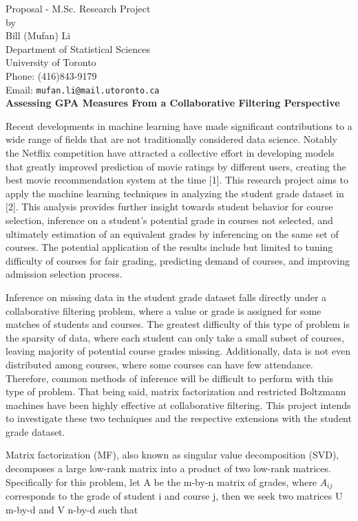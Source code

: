 \documentclass[12pt]{article}
\begin{document}
\begin{center}
Proposal - M.Sc. Research Project \\
by \\
Bill (Mufan) Li \\
Department of Statistical Sciences \\
University of Toronto \\
Phone: (416)843-9179\\
Email: {\tt mufan.li@mail.utoronto.ca}\\
\bigskip\large
{\bf Assessing GPA Measures From a Collaborative Filtering
Perspective}
\end{center}

Recent developments in machine learning have made significant 
contributions to a wide range of fields that are not 
traditionally considered data science.
Notably the Netflix competition have attracted a collective
effort in developing models that greatly improved prediction
of movie ratings by different users,
creating the best movie recommendation system at the time [1].
This research project aims to apply the machine learning
techniques in analyzing the student grade dataset in [2].
This analysis provides further insight towards student behavior for
course selection, inference on a student's potential grade
in courses not selected, and ultimately estimation
of an equivalent grades by inferencing on the same set of courses.
The potential application of the results include but limited to
tuning difficulty of courses for fair grading, 
predicting demand of courses,
and improving admission selection process.

Inference on missing data in the
student grade dataset falls directly under a collaborative
filtering problem, where a value or grade is assigned for
some matches of students and courses.
The greatest difficulty of this type of problem is the sparsity
of data, where each student can only take a small subset of 
courses, leaving majority of potential course grades missing.
Additionally, data is not even distributed among courses, 
where some courses can have few attendance.
Therefore, common methods of inference will be difficult
to perform with this type of problem.
That being said, matrix factorization and restricted Boltzmann
machines have been highly effective at collaborative filtering.
This project intends to investigate these two techniques and
the respective extensions with the student grade dataset.

Matrix factorization (MF), 
also known as singular value decomposition (SVD),
decomposes a large low-rank
matrix into a product of two low-rank matrices.
Specifically for this problem, let A be the m-by-n matrix of grades,
where $A_{ij}$ corresponds to the grade of student i and course j,
then we seek two matrices U m-by-d and V n-by-d such that
\end{document}
